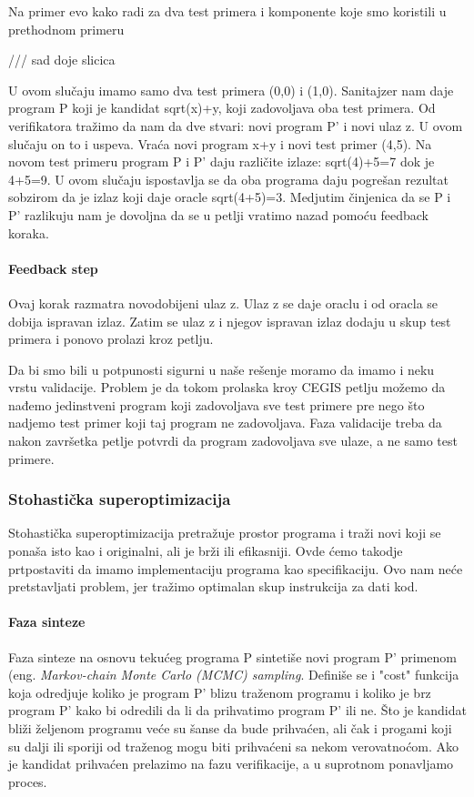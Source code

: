 Na primer evo kako radi za dva test primera i komponente koje smo koristili u prethodnom primeru

/// sad doje slicica

U ovom slučaju imamo samo dva test primera (0,0) i (1,0). Sanitajzer nam daje program P koji je kandidat sqrt(x)+y, koji zadovoljava oba test primera. Od verifikatora tražimo da nam da dve stvari: novi program P' i novi ulaz z. U ovom slučaju on to i uspeva. Vraća novi program x+y i novi test primer (4,5). Na novom test primeru program P i P' daju različite izlaze: sqrt(4)+5=7 dok je 4+5=9. U ovom slučaju ispostavlja se da oba programa daju pogrešan rezultat sobzirom da je izlaz koji daje oracle sqrt(4+5)=3. Medjutim činjenica da se P i P' razlikuju nam je dovoljna da se u petlji vratimo nazad pomoću feedback koraka.

\paragraph{Feedback step}

Ovaj korak razmatra novodobijeni ulaz z. Ulaz z se daje oraclu i od oracla se dobija ispravan izlaz. Zatim se ulaz z i njegov ispravan izlaz dodaju u skup test primera i ponovo prolazi kroz petlju.

Da bi smo bili u potpunosti sigurni u naše rešenje moramo da imamo i neku vrstu validacije. Problem je da tokom prolaska kroy CEGIS petlju možemo da nađemo jedinstveni program koji zadovoljava sve test primere pre nego što nadjemo test primer koji taj program ne zadovoljava. Faza validacije treba da nakon završetka petlje potvrdi da program zadovoljava sve ulaze, a ne samo test primere.

\subsubsection{Stohastička superoptimizacija}
\label{subsec:stohastickaSuperoptimizacija}

Stohastička superoptimizacija pretražuje prostor programa i traži novi koji se ponaša isto kao i originalni, ali je brži ili efikasniji. Ovde ćemo takodje prtpostaviti da imamo implementaciju programa kao specifikaciju. Ovo nam neće pretstavljati problem, jer tražimo optimalan skup instrukcija za dati kod.

\paragraph{Faza sinteze}
Faza sinteze na osnovu tekućeg programa P sintetiše novi program P' primenom (eng. \emph{Markov-chain Monte Carlo (MCMC) sampling}. Definiše se i "cost" funkcija koja odredjuje koliko je program P' blizu traženom programu i koliko je brz program P' kako bi odredili da li da prihvatimo program P' ili ne. Što je kandidat bliži željenom programu veće su šanse da bude prihvaćen, ali čak i progami koji su dalji ili sporiji od traženog mogu biti prihvaćeni sa nekom verovatnoćom. Ako je kandidat prihvaćen prelazimo na fazu verifikacije, a u suprotnom ponavljamo proces.

